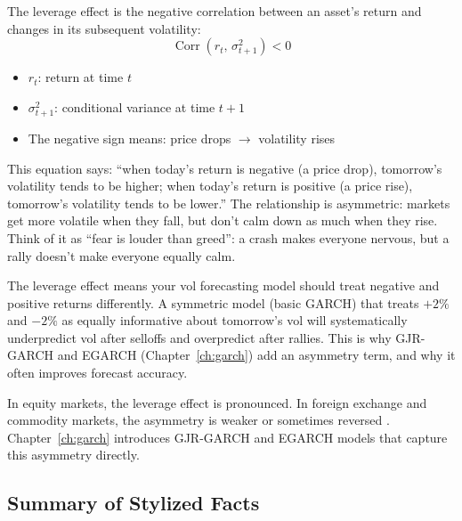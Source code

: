 \begin{definition}
The leverage effect is the negative correlation between an asset's return and changes in its subsequent volatility:
\begin{equation}
  \operatorname{Corr}(r_t,\, \sigma_{t+1}^2) < 0
  \label{eq:leverage-effect}
\end{equation}
\begin{itemize}[nosep]
  \item $r_t$: return at time $t$
  \item $\sigma_{t+1}^2$: conditional variance at time $t+1$
  \item The negative sign means: price drops $\to$ volatility rises
\end{itemize}

\begin{intuition}
This equation says: ``when today's return is negative (a price drop), tomorrow's volatility tends to be higher; when today's return is positive (a price rise), tomorrow's volatility tends to be lower.''
The relationship is asymmetric: markets get more volatile when they fall, but don't calm down as much when they rise.
Think of it as ``fear is louder than greed'': a crash makes everyone nervous, but a rally doesn't make everyone equally calm.
\end{intuition}

\begin{projectconnection}
The leverage effect means your vol forecasting model should treat negative and positive returns differently.
A symmetric model (basic GARCH) that treats $+2\%$ and $-2\%$ as equally informative about tomorrow's vol will systematically underpredict vol after selloffs and overpredict after rallies.
This is why GJR-GARCH and EGARCH (Chapter~\ref{ch:garch}) add an asymmetry term, and why it often improves forecast accuracy.
\end{projectconnection}
\end{definition}

In equity markets, the leverage effect is pronounced.
In foreign exchange and commodity markets, the asymmetry is weaker or sometimes reversed \citep{Cont2001}.
Chapter~\ref{ch:garch} introduces GJR-GARCH and EGARCH models that capture this asymmetry directly.

\subsection{Summary of Stylized Facts}

